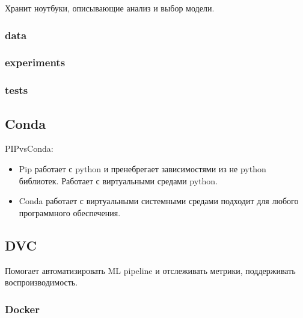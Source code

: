 Хранит ноутбуки, описывающие анализ и выбор модели.

\subsubsection*{data}

\subsubsection*{experiments}

\subsubsection*{tests}

\subsection*{Conda}


PIPvsConda:
\begin{itemize}
    \item Pip работает с python и пренебрегает зависимостями
    из не python библиотек. Работает с виртуальными средами
    python.
    \item Conda работает с виртуальными системными средами
    подходит для любого программного обеспечения.
\end{itemize}

\subsection*{DVC}


Помогает автоматизировать ML pipeline и отслеживать метрики,
поддерживать воспроизводимость.

\subsubsection*{Docker}


